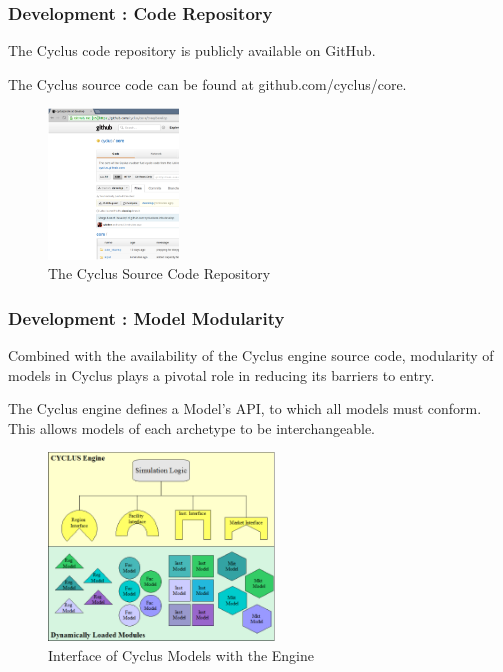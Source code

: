 \begin{frame}[ctb!]
  \frametitle{Development : Code Repository}
  The Cyclus code repository is publicly available on GitHub.

  \vspace{0.2cm}

  The Cyclus source code can be found at github.com/cyclus/core.
  \begin{figure}[htbp!]
    \begin{center}
      \includegraphics[height=4cm]{github-core.ps}
    \end{center}
    \caption{The Cyclus Source Code Repository} 
    \label{fig:github-core}
  \end{figure}
\end{frame}

\begin{frame}[ctb!]
  \frametitle{Development : Model Modularity}
  Combined with the availability of the Cyclus engine source code,
  modularity of models in Cyclus plays a pivotal role in reducing its
  barriers to entry.

  \vspace{0.2cm}
  
  The Cyclus engine defines a Model's API, to which all models must
  conform. This allows models of each archetype to be interchangeable.
  \begin{figure}[htbp!]
    \begin{center}
      \includegraphics[height=5cm]{interfaces.eps}
    \end{center}
    \caption{Interface of Cyclus Models with the Engine} 
    \label{fig:interfaces}
  \end{figure}
\end{frame}
